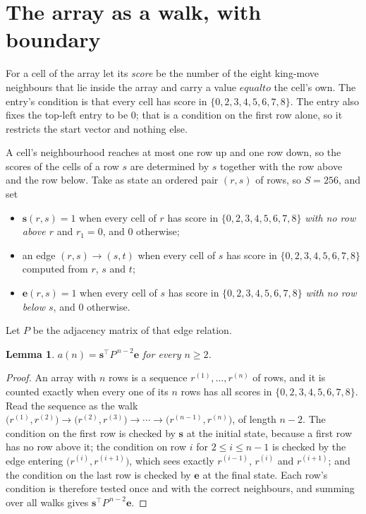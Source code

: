 \documentclass[11pt,a4paper]{article}
\theoremstyle{plain}
\newtheorem{lemma}[theorem]{Lemma}
\theoremstyle{definition}
\begin{document}
\section{The array as a walk, with boundary}

For a cell of the array let its \emph{score} be the number of the eight king-move neighbours that lie inside
the array and carry a value $equal to$ the cell's own. The entry's condition is that every cell
has score in $\{0,2,3,4,5,6,7,8\}$. The entry also fixes the top-left entry to be $0$; that is a condition on the first row alone, so it restricts the start vector and nothing else.

A cell's neighbourhood reaches at most one row up and one row down, so the scores of the
cells of a row $s$ are determined by $s$ together with the row above and the row below.
Take as state an ordered pair $(r,s)$ of rows, so $S=256$, and set
\begin{itemize}
\item $\mathbf{s}(r,s)=1$ when every cell of $r$ has score in $\{0,2,3,4,5,6,7,8\}$ \emph{with no row
above $r$} and $r_1=0$, and $0$ otherwise;
\item an edge $(r,s)\to(s,t)$ when every cell of $s$ has score in $\{0,2,3,4,5,6,7,8\}$ computed from
$r$, $s$ and $t$;
\item $\mathbf{e}(r,s)=1$ when every cell of $s$ has score in $\{0,2,3,4,5,6,7,8\}$ \emph{with no row
below $s$}, and $0$ otherwise.
\end{itemize}
Let $P$ be the adjacency matrix of that edge relation.

\begin{lemma}\label{lem:walk}
$a(n)=\mathbf{s}^{\!\top}P^{\,n-2}\mathbf{e}$ for every $n\ge2$.
\end{lemma}

\begin{proof}
An array with $n$ rows is a sequence $r^{(1)},\dots,r^{(n)}$ of rows, and it is counted
exactly when every one of its $n$ rows has all scores in $\{0,2,3,4,5,6,7,8\}$. Read the sequence as the
walk $\bigl(r^{(1)},r^{(2)}\bigr)\to\bigl(r^{(2)},r^{(3)}\bigr)\to\cdots\to
\bigl(r^{(n-1)},r^{(n)}\bigr)$, of length $n-2$. The condition on the first row is
checked by $\mathbf{s}$ at the initial state, because a first row has no row above it; the
condition on row $i$ for $2\le i\le n-1$ is checked by the edge entering
$\bigl(r^{(i)},r^{(i+1)}\bigr)$, which sees exactly $r^{(i-1)}$, $r^{(i)}$ and
$r^{(i+1)}$; and the condition on the last row is checked by $\mathbf{e}$ at the final
state. Each row's condition is therefore tested once and with the correct neighbours, and
summing over all walks gives $\mathbf{s}^{\!\top}P^{\,n-2}\mathbf{e}$.
\end{proof}
\end{document}
